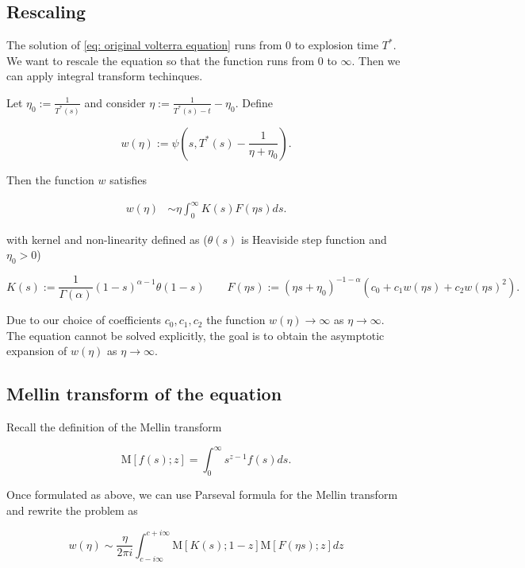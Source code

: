 \documentclass[12pt]{article}
\theoremstyle{plain}
\begin{document}
\subsection{Rescaling}

The solution of \eqref{eq: original volterra equation} runs from $0$ to explosion time $T^*$. We want to rescale the equation so that the function runs from 0 to $\infty$. Then we can apply integral transform techinques.

Let $\eta_{0}:=\frac{1}{T^{*}(s)}$ and consider $\eta:=\frac{1}{T^{*}(s)-t}-\eta_{0}$. Define

$$
w(\eta):=\psi\left(s, T^{*}(s)-\frac{1}{\eta+\eta_{0}}\right).
$$

Then the function $w$ satisfies

$$
\begin{aligned}
w(\eta) &\sim \eta \int _0^\infty K(s)F(\eta s)ds.
\end{aligned}
$$

with kernel and non-linearity defined as ($\theta(s)$ is Heaviside step function and $\eta_0 > 0$)

\begin{equation} \label{integrand definitions}
K(s) := \frac{1}{\Gamma(\alpha)}(1-s)^{\alpha-1} \theta(1-s) \qquad F(\eta s) := (\eta s + \eta _0) ^{-1-\alpha} (c_0 + c_1w(\eta s) + c_2 w(\eta s)^2).
\end{equation}

Due to our choice of coefficients $c_0, c_1, c_2$ the function $w(\eta)\rightarrow \infty$ as $\eta \rightarrow \infty$. The equation cannot be solved explicitly, the goal is to obtain the asymptotic expansion of $w(\eta)$ as $\eta \rightarrow \infty$.

\subsection{Mellin transform of the equation}

Recall the definition of the Mellin transform

$$
\mathrm M [f(s); z] = \int _0^\infty s^{z-1} f(s) ds.
$$

Once formulated as above, we can use Parseval formula for the Mellin transform and rewrite the problem as

\begin{equation}\label{parseval}
w(\eta) \sim \frac{\eta}{2 \pi i} \int_{c-i \infty}^{c+i \infty} \mathrm{M}[K(s) ; 1-z] \mathrm{M}[F(\eta s) ; z] d z
\end{equation}
\end{document}
